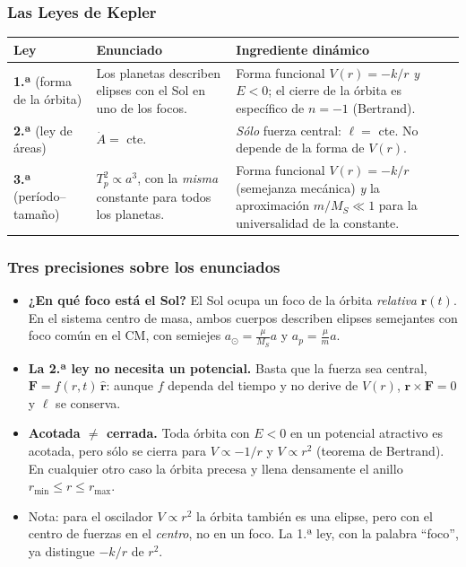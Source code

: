 \documentclass[10pt]{beamer}
\newcommand{\uv}[1]{\hat{\mathbf{#1}}}
\newcommand{\vect}[1]{\mathbf{#1}}
\newcommand{\vell}{\boldsymbol{\ell}}   %
\begin{document}
\begin{frame}
\frametitle{Las Leyes de Kepler}
\footnotesize
\begin{tabular}{@{}p{}p{}p{}@{}}
\toprule
\textbf{Ley} & \textbf{Enunciado} & \textbf{Ingrediente dinámico} \\
\midrule
\textbf{1.ª} (forma de la órbita)
 & Los planetas describen elipses con el Sol en uno de los focos.
 & Forma funcional $V(r)=-k/r$ \emph{y} $E<0$; el cierre de la órbita es
   específico de $n=-1$ (Bertrand). \\[2pt]
\textbf{2.ª} (ley de áreas)
 & $\dot A=$ cte.
 & \emph{Sólo} fuerza central: $\vell=$ cte. No depende de la forma de
   $V(r)$. \\[2pt]
\textbf{3.ª} (período--tamaño)
 & $T_p^{2}\propto a^{3}$, con la \emph{misma} constante para todos los planetas.
 & Forma funcional $V(r)=-k/r$ (semejanza mecánica) \emph{y} la aproximación
   $m/M_S\ll 1$ para la universalidad de la constante. \\
\bottomrule
\end{tabular}

\vspace{1em}
\end{frame}

\begin{frame}
\frametitle{Tres precisiones sobre los enunciados}
\begin{itemize}
  \item<1-> \textbf{¿En qué foco está el Sol?} El Sol ocupa un foco de la órbita
        \emph{relativa} $\vect{r}(t)$. En el sistema centro de masa, ambos
        cuerpos describen elipses semejantes con foco común en el CM, con
        semiejes $a_{\odot}=\frac{\mu}{M_S}a$ y $a_{p}=\frac{\mu}{m}a$.
  \item<2-> \textbf{La 2.ª ley no necesita un potencial.} Basta que la fuerza sea
        central, $\vect{F}=f(r,t)\,\uv{r}$: aunque $f$ dependa del tiempo y no
        derive de $V(r)$, $\vect{r}\times\vect{F}=0$ y $\vell$ se conserva.
  \item<3-> \textbf{Acotada $\neq$ cerrada.} Toda órbita con $E<0$ en un
        potencial atractivo es acotada, pero sólo se cierra para
        $V\propto -1/r$ y $V\propto r^{2}$ (teorema de Bertrand). En cualquier
        otro caso la órbita precesa y llena densamente el anillo
        $r_{\min}\le r\le r_{\max}$.
  \item<4-> \alert{Nota:} para el oscilador $V\propto r^{2}$ la órbita también es
        una elipse, pero con el centro de fuerzas en el \emph{centro}, no en un
        foco. La 1.ª ley, con la palabra ``foco'', ya distingue $-k/r$ de $r^2$.
\end{itemize}
\end{frame}
\end{document}
